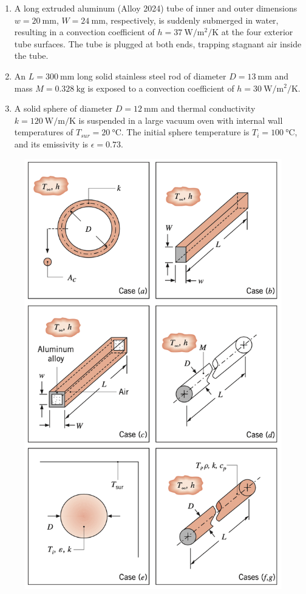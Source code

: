 \documentclass[12pt,letterpaper]{article}
\begin{document}
\begin{enumerate}
\begin{enumerate}
        \item A long extruded aluminum (Alloy 2024) tube of inner and outer dimensions $w = \SI{20}{\milli\meter}$, $W = \SI{24}{\milli\meter}$, respectively, is suddenly submerged in water, resulting in a convection coefficient of $h = \SI{37}{\watt\per\square\meter\per\kelvin}$ at the four exterior tube surfaces.
        The tube is plugged at both ends, trapping stagnant air inside the tube.
        
        \item An $L = \SI{300}{\milli\meter}$ long solid stainless steel rod of diameter $D = \SI{13}{\milli\meter}$ and mass $M = \SI{0.328}{\kilogram}$ is exposed to a convection coefficient of $h = \SI{30}{\watt\per\square\meter\per\kelvin}$.
        
        \item A solid sphere of diameter $D = \SI{12}{\milli\meter}$ and thermal conductivity $k = \SI{120}{\watt\per\meter\per\kelvin}$ is suspended in a large vacuum oven with internal wall temperatures of $T_{\mathit{sur}} = \SI{20}{\celsius}$.
        The initial sphere temperature is $T_i = \SI{100}{\celsius}$, and its emissivity is $\epsilon = 0.73$.
    \end{enumerate}

    \begin{figure}[!htpb]
        \centering
        \includegraphics[width=0.75\linewidth]{./image1.png}
    \end{figure}


\end{enumerate}
\end{document}
